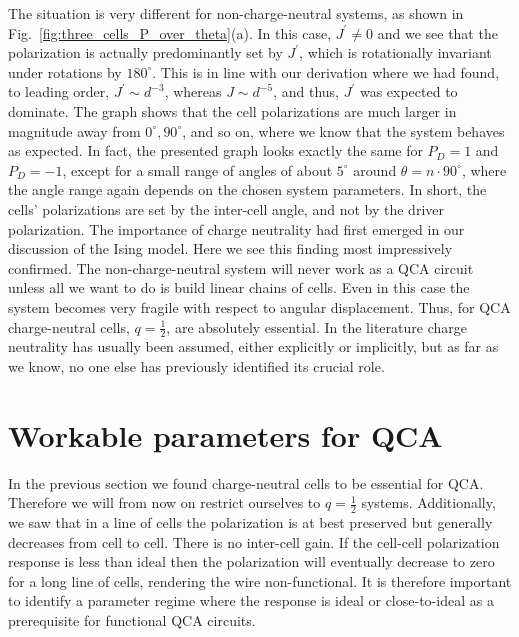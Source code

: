 The situation is very different for non-charge-neutral systems, as shown in
Fig.~\ref{fig:three_cells_P_over_theta}(a). In this case, $J^{\prime} \ne 0$ and
we see that the polarization is actually predominantly set by $J^{\prime}$,
which is rotationally invariant under rotations by $180^{\circ}$. This is in
line with our derivation where we had found, to leading order, $J^{\prime} \sim
d^{-3}$, whereas $J \sim d^{-5}$, and thus, $J^{\prime}$ was expected to
dominate. The graph shows that the cell polarizations are much larger in
magnitude away from $0^{\circ}, 90^{\circ}$, and so on, where we know that the
system behaves as expected. In fact, the presented graph looks exactly the same
for $P_D = 1$ and $P_D = -1$, except for a small range of angles of about
$5^{\circ}$ around $\theta = n \cdot 90^{\circ}$, where the angle range again
depends on the chosen system parameters. In short, the cells' polarizations are
set by the inter-cell angle, and not by the driver polarization. The importance
of charge neutrality had first emerged in our discussion of the Ising model.
Here we see this finding most impressively confirmed. The non-charge-neutral
system will never work as a QCA circuit unless all we want to do is build linear
chains of cells. Even in this case the system becomes very fragile with respect
to angular displacement. Thus, for QCA charge-neutral cells, $q=\frac{1}{2}$,
are absolutely essential. In the literature charge neutrality has usually been
assumed, either explicitly or implicitly, but as far as we know, no one else has
previously identified its crucial role.


\section{Workable parameters for QCA}

In the previous section we found charge-neutral cells to be essential for QCA.
Therefore we will from now on restrict ourselves to $q=\frac{1}{2}$ systems.
Additionally, we saw that in a line of cells the polarization is at best
preserved but generally decreases from cell to cell. There is no inter-cell
gain. If the cell-cell polarization response is less than ideal then the
polarization will eventually decrease to zero for a long line of cells,
rendering the wire non-functional. It is therefore important to identify a
parameter regime where the response is ideal or close-to-ideal as a prerequisite
for functional QCA circuits.

